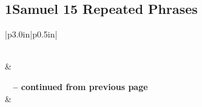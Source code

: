 \subsection{1Samuel 15 Repeated Phrases}


\normalsize
 
\begin{center}
\begin{longtable}{|p{3.0in}|p{0.5in}|}
\caption[1Samuel 15 Repeated Phrases]{1Samuel 15 Repeated Phrases}\label{table:Repeated Phrases 1Samuel 15} \\
\hline {} &  \\ \hline 
\endfirsthead
 
{{\bfseries \tablename\ \thetable{} -- continued from previous page}} \\  
\hline {} &  \\ \hline 
\endhead
 

\end{longtable}
\end{center}
